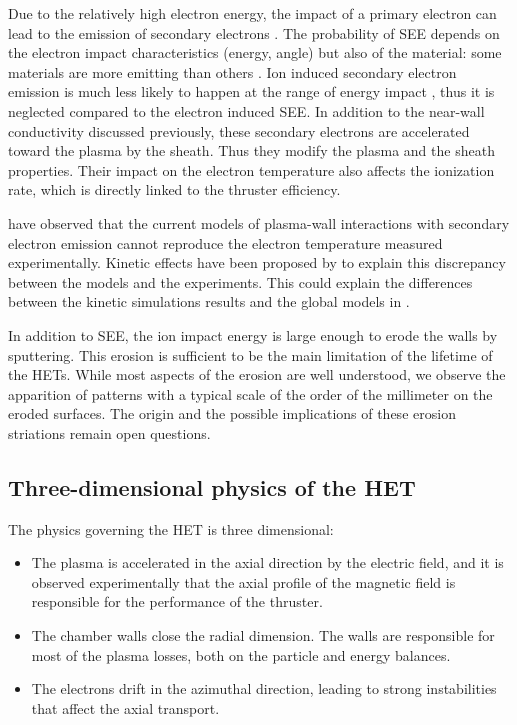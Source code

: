   Due to the relatively high electron energy, the impact of a primary electron can lead to the emission of secondary electrons \citep{barral2003a,villemant2018}.
  The probability of \ac{SEE} depends on the electron impact characteristics (energy, angle) but also of the material\string: some materials are more emitting than others \citep{gascon2003}.
  Ion induced secondary electron emission is much less likely to happen at the range of energy impact \citep{ohya2004}, thus it is neglected compared to the electron induced \ac{SEE}.
  In addition to the near-wall conductivity discussed previously, these secondary electrons are accelerated toward the plasma by the sheath.
  Thus they modify the plasma and the sheath properties.
  Their impact on the electron temperature also affects the ionization rate, which is directly linked to the thruster efficiency.
  
  
  \citet{raitses2005} have observed that the current models of plasma-wall interactions with secondary electron emission cannot reproduce the electron temperature measured experimentally.
  Kinetic effects have been proposed by \citet{sydorenko2007} to explain this discrepancy between the models and the experiments.
  This could explain the differences between the kinetic simulations results and the global models in \citet{croes2017}.   
    
  \vspace{1em}
  In addition to \ac{SEE}, the ion impact energy is large enough to erode the walls by sputtering.
  This erosion is sufficient to be the main limitation of the lifetime of the \ac{HET}s.
  While most aspects of the erosion are well understood, we observe the apparition of  patterns with a typical scale of the order of the millimeter on the eroded surfaces.
  The origin and the possible implications of these erosion striations remain open questions.
  

\subsection*{Three-dimensional physics of the HET}
\label{sec-3Dphi}

The physics governing the \ac{HET} is three dimensional\string:
\begin{itemize}
  \item The plasma is accelerated in the axial direction by the electric field, and it is observed experimentally that the axial profile of the magnetic field is responsible for the performance of the thruster.
  \item The chamber walls close the radial dimension. The walls are responsible for most of the plasma losses, both on the particle and energy balances.
  \item The electrons drift in the azimuthal direction, leading to strong instabilities that affect the axial transport.
\end{itemize}

